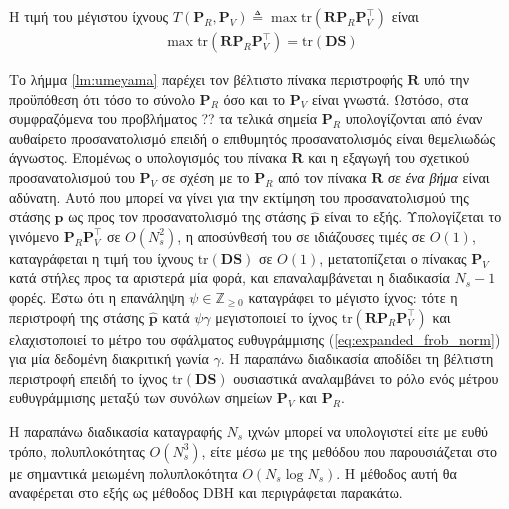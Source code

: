 \begin{corollary}
  \label{corollary:umeyama}
  Η τιμή του μέγιστου ίχνους
  $T(\bm{P}_R, \bm{P}_V) \triangleq \max\text{tr}(\bm{R} \bm{P}_R \bm{P}_V^\top)$
  είναι
  \begin{align}
  \max\text{tr}(\bm{R} \bm{P}_R \bm{P}_V^\top) = \text{tr}(\bm{D}\bm{S})
  \end{align}
\end{corollary}

Το λήμμα \ref{lm:umeyama} παρέχει τον βέλτιστο πίνακα περιστροφής $\bm{R}$ υπό
την προϋπόθεση ότι τόσο το σύνολο $\bm{P}_R$ όσο και το $\bm{P}_V$ είναι
γνωστά.  Ωστόσο, στα συμφραζόμενα του προβλήματος ?? τα τελικά σημεία
$\bm{P}_R$ υπολογίζονται από έναν αυθαίρετο προσανατολισμό επειδή ο επιθυμητός
προσανατολισμός είναι θεμελιωδώς άγνωστος. Επομένως ο υπολογισμός του πίνακα
$\bm{R}$ και η εξαγωγή  του σχετικού προσανατολισμού του $\bm{P}_V$ σε σχέση με
το $\bm{P}_R$ από τον πίνακα $\bm{R}$ \textit{σε ένα βήμα} είναι αδύνατη. Αυτό
που μπορεί να γίνει για την εκτίμηση του προσανατολισμού της στάσης $\bm{p}$ ως
προς τον προσανατολισμό της στάσης $\hat{\bm{p}}$ είναι το εξής. Υπολογίζεται
το γινόμενο $\bm{P}_R \bm{P}_V^\top$ σε $O(N_s^2)$, η αποσύνθεσή του σε
ιδιάζουσες τιμές σε $O(1)$, καταγράφεται η τιμή του ίχνους
$\text{tr}(\bm{D}\bm{S})$ σε $O(1)$, μετατοπίζεται ο πίνακας $\bm{P}_V$ κατά
στήλες προς τα αριστερά μία φορά, και επαναλαμβάνεται η διαδικασία $N_s-1$
φορές. Έστω ότι η επανάληψη $\psi \in \mathbb{Z}_{\geq 0}$ καταγράφει το
μέγιστο ίχνος: τότε η περιστροφή της στάσης $\hat{\bm{p}}$ κατά $\psi \gamma$
μεγιστοποιεί το ίχνος $\text{tr}(\bm{R} \bm{P}_R \bm{P}_V^\top)$ και
ελαχιστοποιεί το μέτρο του σφάλματος ευθυγράμμισης
(\ref{eq:expanded_frob_norm}) για μία δεδομένη διακριτική γωνία $\gamma$. Η
παραπάνω διαδικασία αποδίδει τη βέλτιστη περιστροφή επειδή το ίχνος
$\text{tr}(\bm{D}\bm{S})$ ουσιαστικά αναλαμβάνει το ρόλο ενός μέτρου
ευθυγράμμισης μεταξύ των συνόλων σημείων $\bm{P}_V$ και $\bm{P}_R$.

Η παραπάνω διαδικασία καταγραφής $N_s$ ιχνών μπορεί να υπολογιστεί είτε με ευθύ
τρόπο, πολυπλοκότητας $O(N_s^3)$, είτε μέσω με της μεθόδου που παρουσιάζεται
στο \cite{Dogan2015} με σημαντικά μειωμένη πολυπλοκότητα $O(N_s \log N_s)$.  Η
μέθοδος αυτή θα αναφέρεται στο εξής ως μέθοδος DBH και περιγράφεται παρακάτω.


